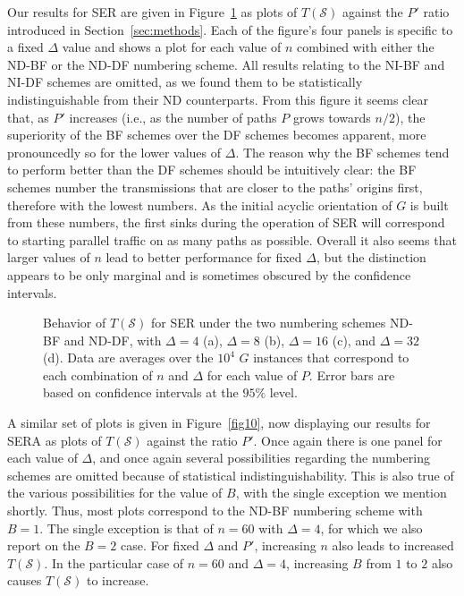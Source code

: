 \documentclass{article}
\begin{document}
Our results for SER are given in Figure~\ref{fig9} as plots of $T(\mathcal{S})$
against the $P'$ ratio introduced in Section~\ref{sec:methods}. Each of the
figure's four panels is specific to a fixed $\Delta$ value and shows a plot for
each value of $n$ combined with either the ND-BF or the ND-DF numbering scheme.
All results relating to the NI-BF and NI-DF schemes are omitted, as we found
them to be statistically indistinguishable from their ND counterparts. From this
figure it seems clear that, as $P'$ increases (i.e., as the number of paths $P$
grows towards $n/2$), the superiority of the BF schemes over the DF schemes
becomes apparent, more pronouncedly so for the lower values of $\Delta$. The
reason why the BF schemes tend to perform better than the DF schemes should be
intuitively clear: the BF schemes number the transmissions that are closer to
the paths' origins first, therefore with the lowest numbers. As the initial
acyclic orientation of $G$ is built from these numbers, the first sinks during
the operation of SER will correspond to starting parallel traffic on as many
paths as possible. Overall it also seems that larger values of $n$ lead to
better performance for fixed $\Delta$, but the distinction appears to be only
marginal and is sometimes obscured by the confidence intervals.

\begin{figure}[p]
\centering
{}
\caption{Behavior of $T(\mathcal{S})$ for SER under the two numbering schemes
ND-BF and ND-DF, with $\Delta=4$ (a), $\Delta=8$ (b), $\Delta=16$ (c), and
$\Delta=32$ (d). Data are averages over the $10^4$ $G$ instances that correspond
to each combination of $n$ and $\Delta$ for each value of $P$. Error bars are
based on confidence intervals at the $95\%$ level.}
\label{fig9}
\end{figure}

A similar set of plots is given in Figure~\ref{fig10}, now displaying our
results for SERA as plots of $T(\mathcal{S})$ against the ratio $P'$. Once
again there is one panel for each value of $\Delta$, and once again several
possibilities regarding the numbering schemes are omitted because of statistical
indistinguishability. This is also true of the various possibilities for the
value of $B$, with the single exception we mention shortly. Thus, most plots
correspond to the ND-BF numbering scheme with $B=1$. The single exception is
that of $n=60$ with $\Delta=4$, for which we also report on the $B=2$ case. For
fixed $\Delta$ and $P'$, increasing $n$ also leads to increased
$T(\mathcal{S})$. In the particular case of $n=60$ and $\Delta=4$, increasing
$B$ from $1$ to $2$ also causes $T(\mathcal{S})$ to increase.
\end{document}

